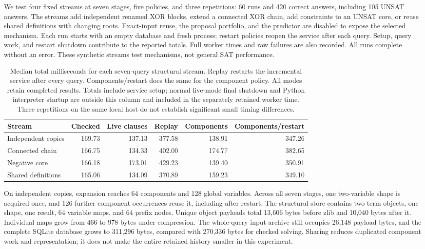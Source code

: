 \documentclass[11pt,a4paper]{article}
\numberwithin{equation}{section}
\theoremstyle{plain}
\theoremstyle{definition}
\theoremstyle{remark}
\begin{document}
We test four fixed streams at seven stages, five policies, and three repetitions: 60 runs and 420 correct answers, including 105 UNSAT answers. The streams add independent renamed XOR blocks, extend a connected XOR chain, add constraints to an UNSAT core, or reuse shared definitions with changing roots. Exact-input reuse, the proposal portfolio, and the predictor are disabled to expose the selected mechanism. Each run starts with an empty database and fresh process; restart policies reopen the service after each query. Setup, query work, and restart shutdown contribute to the reported totals. Full worker times and raw failures are also recorded. All runs complete without an error. These synthetic streams test mechanisms, not general SAT performance.

\begin{table}[htbp]
\centering
\small
\setlength{\tabcolsep}{5pt}
\begin{tabular}{lrrrrr}
\toprule
Stream & Checked & Live clauses & Replay & Components & Components/restart \\
\midrule
Independent copies & 169.73 & 137.13 & 377.58 & 138.91 & 347.26 \\
Connected chain & 166.75 & 134.33 & 402.00 & 174.77 & 382.65 \\
Negative core & 166.18 & 173.01 & 429.23 & 139.40 & 350.91 \\
Shared definitions & 165.06 & 134.09 & 370.89 & 159.23 & 349.10 \\
\bottomrule
\end{tabular}
\caption{Median total milliseconds for each seven-query structural stream. Replay restarts the incremental service after every query. Components/restart does the same for the component policy. All modes retain completed results. Totals include service setup; normal live-mode final shutdown and Python interpreter startup are outside this column and included in the separately retained worker time. Three repetitions on the same local host do not establish significant small timing differences.}
\label{tab:structural-study}
\end{table}

On independent copies, expansion reaches 64 components and 128 global variables. Across all seven stages, one two-variable shape is acquired once, and 126 further component occurrences reuse it, including after restart. The structural store contains two term objects, one shape, one result, 64 variable maps, and 64 prefix nodes. Unique object payloads total 13,606 bytes before zlib and 10,040 bytes after it. Individual maps grow from 466 to 978 bytes under compression. The whole-query input archive still occupies 26,148 payload bytes, and the complete SQLite database grows to 311,296 bytes, compared with 270,336 bytes for checked solving. Sharing reduces duplicated component work and representation; it does not make the entire retained history smaller in this experiment.
\end{document}
